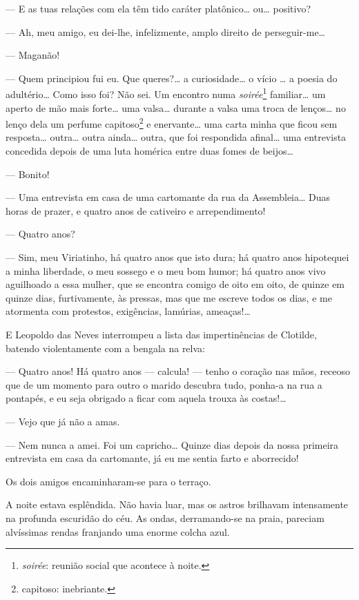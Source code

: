 --- E as tuas relações com ela têm tido caráter platônico\ldots{} ou\ldots{}
positivo?

--- Ah, meu amigo, eu dei-lhe, infelizmente, amplo direito de
perseguir-me\ldots{}

--- Maganão!

--- Quem principiou fui eu. Que queres?\ldots{} a curiosidade\ldots{} o vício
\ldots{} a poesia do adultério\ldots{} Como isso foi? Não sei. Um encontro numa
\emph{soirée}\footnote{\emph{soirée}: reunião social que acontece à
  noite.} familiar\ldots{} um aperto de mão mais forte\ldots{} uma valsa\ldots{}
durante a valsa uma troca de lenços\ldots{} no lenço dela um perfume
capitoso\footnote{capitoso: inebriante.} e enervante\ldots{} uma carta minha
que ficou sem resposta\ldots{} outra\ldots{} outra ainda\ldots{} outra, que foi
respondida afinal\ldots{} uma entrevista concedida depois de uma luta
homérica entre duas fomes de beijos\ldots{}

--- Bonito!

--- Uma entrevista em casa de uma cartomante da rua da Assembleia\ldots{}
Duas horas de prazer, e quatro anos de cativeiro e arrependimento!

--- Quatro anos?

--- Sim, meu Viriatinho, há quatro anos que isto dura; há quatro anos
hipotequei a minha liberdade, o meu sossego e o meu bom humor; há quatro
anos vivo aguilhoado a essa mulher, que se encontra comigo de oito em
oito, de quinze em quinze dias, furtivamente, às pressas, mas que me
escreve todos os dias, e me atormenta com protestos, exigências,
lamúrias, ameaças!\ldots{}

E Leopoldo das Neves interrompeu a lista das impertinências de Clotilde,
batendo violentamente com a bengala na relva:

--- Quatro anos! Há quatro anos --- calcula! --- tenho o coração nas
mãos, receoso que de um momento para outro o marido descubra tudo,
ponha-a na rua a pontapés, e eu seja obrigado a ficar com aquela trouxa
às costas!\ldots{}

--- Vejo que já não a amas.

--- Nem nunca a amei. Foi um capricho\ldots{} Quinze dias depois da nossa
primeira entrevista em casa da cartomante, já eu me sentia farto e
aborrecido!

Os dois amigos encaminharam-se para o terraço.

A noite estava esplêndida. Não havia luar, mas os astros brilhavam
intensamente na profunda escuridão do céu. As ondas, derramando-se na
praia, pareciam alvíssimas rendas franjando uma enorme colcha azul.

